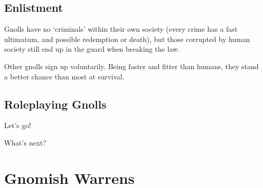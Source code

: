 \begin{multicols}{2}
\subsection{Enlistment}

Gnolls have no `criminals' within their own society (every crime has a fast ultimatum, and possible redemption or death), but those corrupted by human society still end up in the \gls{guard} when breaking the law.

Other gnolls sign up voluntarily.
Being faster and fitter than humans, they stand a better chance than most at survival.

\subsection{Roleplaying Gnolls}

Let's go!


{\raggedleft What's next?\par}

\end{multicols}

\section[Gnomes]{Gnomish Warrens \Gn}
\label{gnomishWarrens}

